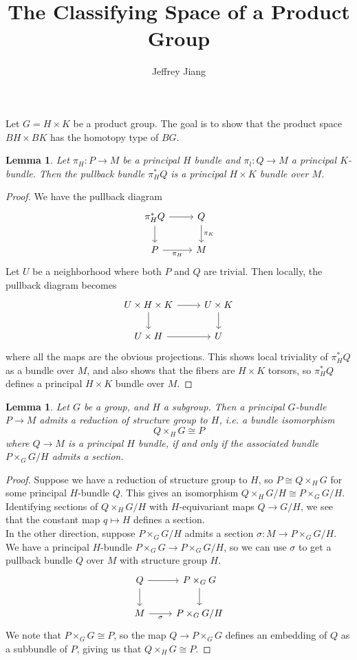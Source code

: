 \documentclass[psamsfonts, 12pt]{amsart}
\newtheorem{lem}[thm]{Lemma}
\theoremstyle{definition}
\theoremstyle{remark}
\begin{document}
%
\author{Jeffrey Jiang}
%
\title{The Classifying Space of a Product Group}
%
\maketitle
%
Let $G = H \times K$ be a product group. The goal is to show that the product
space $BH \times BK$ has the homotopy type of $BG$.
%
\begin{lem}
Let $\pi_H : P \to M$ be a principal $H$ bundle and $\pi_l : Q \to M$ a principal
$K$-bundle. Then the pullback bundle $\pi_H^*Q$ is a principal $H \times K$ bundle
over $M$.
\end{lem}
%
\begin{proof}
We have the pullback diagram
\[\begin{tikzcd}
\pi_H^*Q \ar[r] \ar[d] & Q \ar[d, "\pi_K"] \\
P \ar[r, "\pi_H"'] & M
\end{tikzcd}\]
Let $U$ be a neighborhood where both $P$ and $Q$ are trivial. Then locally, the
pullback diagram becomes
\[\begin{tikzcd}
U\times H \times K \ar[r] \ar[d] & U \times K \ar[d] \\
U \times H \ar[r] & U
\end{tikzcd}\]
where all the maps are the obvious projections. This shows local triviality of
$\pi^*_HQ$ as a bundle over $M$, and also shows that the fibers are $H \times K$
torsors, so $\pi_H^*Q$ defines a principal $H\times K$ bundle over $M$.
\end{proof}
%
\iffalse
\begin{lem}
Let $G$ be a group, and $H$ a subgroup. Then a principal $G$-bundle $P \to M$
admits a reduction of structure group to $H$, i.e. a bundle isomorphism
\[
Q \times_H G \cong P
\]
where $Q \to M$ is a principal $H$ bundle, if and only if the associated bundle
$P \times_G G/H$ admits a section.
\end{lem}
%
\begin{proof}
Suppose we have a reduction of structure group to $H$, so $P \cong Q \times_H G$
for some principal $H$-bundle $Q$. This gives an isomorphism
$Q \times_H G/H \cong P \times_G G/H$. Identifying sections of $Q \times_H G/H$ with
$H$-equivariant maps $Q \to G/H$, we see that the constant map $q \mapsto H$ defines
a section. \\

In the other direction, suppose $P\times_G G/H$ admits a section
$\sigma : M \to P\times_G G/H$. We have a principal $H$-bundle
$P \times_G G \to P\times_G G/H$, so we can use $\sigma$ to get a pullback bundle
$Q$ over $M$ with structure group $H$.
\[\begin{tikzcd}
Q \ar[r]\ar[d] & P\times_G G \ar[d] \\
M \ar[r, "\sigma"'] & P\times_G G/H
\end{tikzcd}\]
We note that $P\times_G G \cong P$, so the map $Q \to P\times_G G$ defines
an embedding of $Q$ as a subbundle of $P$, giving us that $Q \times_H G \cong P$.
\end{proof}
\end{document}
